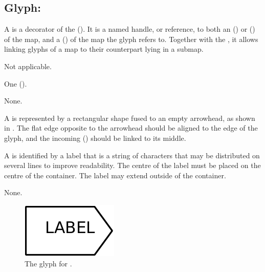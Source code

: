 
\subsection{Glyph: }
\label{sec:submapTerminal}

A  is a decorator of the  ().
It is a named handle, or reference, to both an  () or  () of the map, and a  () of the map the  glyph refers to.
Together with the , it allows linking glyphs of a map to their counterpart lying in a submap.

\begin{glyphDescription}

\glyphSboTerm Not applicable.


\glyphIncoming
One  ().



\glyphOutgoing
None.


\glyphContainer A  is represented by a rectangular shape fused to an empty arrowhead, as shown in .
The flat edge opposite to the arrowhead should be aligned to the edge of the  glyph, and the incoming  () should be linked to its middle.

\glyphLabel A  is identified by a label that is  a string of characters that may be distributed on several lines to improve readability.
The centre of the label must be placed on the centre of the container.
The label may extend outside of the container.

\glyphAux
None.

\end{glyphDescription}


\begin{figure}[H]
  \centering
  \includegraphics{images/build/submap_terminal.pdf}
  \caption{The \PD glyph for .}
  \label{fig:submapTerminal}
\end{figure}


